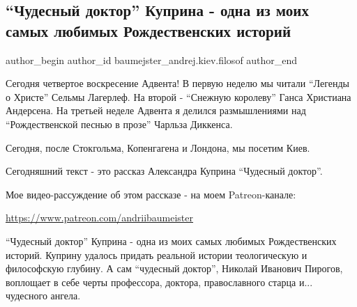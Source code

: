  
 
 
 
 
 
\subsection{\enquote{Чудесный доктор} Куприна - одна из моих самых любимых Рождественских историй}
\label{sec:19_12_2021.fb.baumejster_andrej.kiev.filosof.1.chudesnyj_doktor_kuprin_rozhdestvo}
 
\ifcmt
 author_begin
   author_id baumejster_andrej.kiev.filosof
 author_end
\fi

Сегодня четвертое воскресение Адвента! В первую неделю мы читали \enquote{Легенды о
Христе} Сельмы Лагерлеф. На второй - \enquote{Снежную королеву} Ганса Христиана
Андерсена. На третьей неделе Адвента я делился размышлениями над
\enquote{Рождественской песнью в прозе} Чарльза Диккенса. 

Сегодня, после Стокгольма, Копенгагена и Лондона, мы посетим Киев. 

Сегодняшний текст - это рассказ Александра Куприна \enquote{Чудесный доктор}. 

Мое видео-рассуждение об этом рассказе - на моем Patreon-канале:

\url{https://www.patreon.com/andriibaumeister} 

\enquote{Чудесный доктор} Куприна - одна из моих самых любимых Рождественских историй.
Куприну удалось придать реальной истории теологическую и философскую глубину. А
сам \enquote{чудесный доктор}, Николай Иванович Пирогов, воплощает в себе черты
профессора, доктора, православного старца и... чудесного ангела. 

